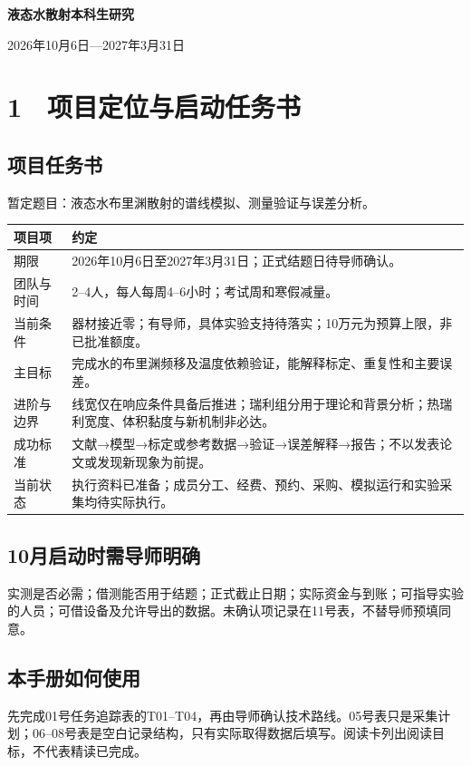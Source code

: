 \documentclass[UTF8,a4paper,11pt,fontset=fandol]{ctexart}
\begin{document}
\begin{center}{\LARGE\bfseries 液态水散射本科生研究}\par{}\par\medskip 2026年10月6日—2027年3月31日\end{center}
\section*{1　项目定位与启动任务书}
\subsection*{项目任务书}
暂定题目：液态水布里渊散射的谱线模拟、测量验证与误差分析。

\begin{longtable}{P{2.5cm}P{12.1cm}}
\toprule
\textbf{项目项} & \textbf{约定}\\\midrule\endhead
期限 & 2026年10月6日至2027年3月31日；正式结题日待导师确认。\\[0.35em]
团队与时间 & 2–4人，每人每周4–6小时；考试周和寒假减量。\\[0.35em]
当前条件 & 器材接近零；有导师，具体实验支持待落实；10万元为预算上限，非已批准额度。\\[0.35em]
主目标 & 完成水的布里渊频移及温度依赖验证，能解释标定、重复性和主要误差。\\[0.35em]
进阶与边界 & 线宽仅在响应条件具备后推进；瑞利组分用于理论和背景分析；热瑞利宽度、体积黏度与新机制非必达。\\[0.35em]
成功标准 & 文献→模型→标定或参考数据→验证→误差解释→报告；不以发表论文或发现新现象为前提。\\[0.35em]
当前状态 & 执行资料已准备；成员分工、经费、预约、采购、模拟运行和实验采集均待实际执行。\\[0.35em]
\bottomrule\end{longtable}
\subsection*{10月启动时需导师明确}
实测是否必需；借测能否用于结题；正式截止日期；实际资金与到账；可指导实验的人员；可借设备及允许导出的数据。未确认项记录在11号表，不替导师预填同意。

\subsection*{本手册如何使用}
先完成01号任务追踪表的T01–T04，再由导师确认技术路线。05号表只是采集计划；06–08号表是空白记录结构，只有实际取得数据后填写。阅读卡列出阅读目标，不代表精读已完成。
\end{document}
